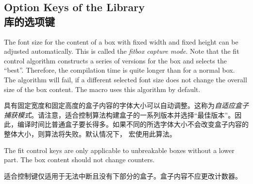 \subsection{Option Keys of the Library\\库的选项键}\label{subsec:fit}


The font size for the content of a box with fixed width and fixed height
can be adjusted automatically. This is called the \emph{fitbox capture mode}.
Note that the fit control algorithm
constructs a series of versions for the box and selects the \enquote{best}.
Therefore, the compilation time is quite longer than for a normal box.
The algorithm will fail, if a different selected font size does not change the
overall size of the box content.
The  macro uses this algorithm by default.

具有固定宽度和固定高度的盒子内容的字体大小可以自动调整。这称为\emph{自适应盒子捕获模式}。请注意，适合控制算法构建盒子的一系列版本并选择\enquote{最佳版本}。因此，编译时间比普通盒子要长得多。如果不同的所选字体大小不会改变盒子内容的整体大小，则算法将失败。默认情况下， 宏使用此算法。
\medskip
\begin{marker}
The fit control keys are only applicable to unbreakable boxes without
a lower part.
The box content should not change counters.

适合控制键仅适用于无法中断且没有下部分的盒子。盒子内容不应更改计数器。
\end{marker}


